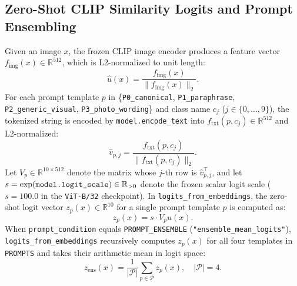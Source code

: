 \documentclass[11pt,a4paper]{article}
\begin{document}
\subsection{Zero-Shot CLIP Similarity Logits and Prompt Ensembling}
Given an image $x$, the frozen CLIP image encoder produces a feature vector $f_{\text{img}}(x) \in \mathbb{R}^{512}$, which is L2-normalized to unit length:
\begin{equation}
  \label{eq:img_norm}
  \hat{u}(x) = \frac{f_{\text{img}}(x)}{\|f_{\text{img}}(x)\|_2}.
\end{equation}
For each prompt template $p$ in \{\texttt{P0\_\allowbreak{}canonical}, \texttt{P1\_\allowbreak{}paraphrase}, \texttt{P2\_\allowbreak{}generic\_\allowbreak{}visual}, \texttt{P3\_\allowbreak{}photo\_\allowbreak{}wording}\} and class name $c_j$ ($j \in \{0, \dots, 9\}$), the tokenized string is encoded by \texttt{model.encode\_\allowbreak{}text} into $f_{\text{txt}}(p, c_j) \in \mathbb{R}^{512}$ and L2-normalized:
\begin{equation}
  \label{eq:txt_norm}
  \hat{v}_{p, j} = \frac{f_{\text{txt}}(p, c_j)}{\|f_{\text{txt}}(p, c_j)\|_2}.
\end{equation}
Let $V_p \in \mathbb{R}^{10 \times 512}$ denote the matrix whose $j$-th row is $\hat{v}_{p, j}^\top$, and let $s = \exp(\text{\texttt{model.logit\_\allowbreak{}scale}}) \in \mathbb{R}_{>0}$ denote the frozen scalar logit scale ($s = 100.0$ in the \texttt{ViT-B/\allowbreak{}32} checkpoint). In \texttt{logits\_\allowbreak{}from\_\allowbreak{}embeddings}, the zero-shot logit vector $z_p(x) \in \mathbb{R}^{10}$ for a single prompt template $p$ is computed as:
\begin{equation}
  \label{eq:single_logits}
  z_p(x) = s \cdot V_p \hat{u}(x).
\end{equation}
When \texttt{prompt\_\allowbreak{}condition} equals \texttt{PROMPT\_\allowbreak{}ENSEMBLE} (\texttt{"ensemble\_\allowbreak{}mean\_\allowbreak{}logits"}), \texttt{logits\_\allowbreak{}from\_\allowbreak{}embeddings} recursively computes $z_p(x)$ for all four templates in \texttt{PROMPTS} and takes their arithmetic mean in logit space:
\begin{equation}
  \label{eq:ensemble_logits}
  z_{\text{ens}}(x) = \frac{1}{|\mathcal{P}|} \sum_{p \in \mathcal{P}} z_p(x), \quad |\mathcal{P}| = 4.
\end{equation}
\end{document}
